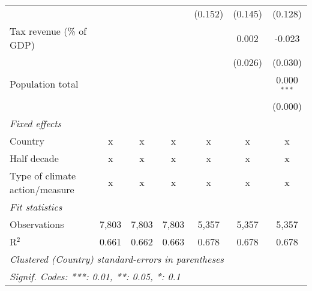\begin{tabular}{lcccccc}
                                                  &         &                &                & (0.152)        & (0.145)        & (0.128)\\   
   Tax revenue (\% of GDP)                        &         &                &                &                & 0.002          & -0.023\\   
                                                  &         &                &                &                & (0.026)        & (0.030)\\   
   Population total                               &         &                &                &                &                & 0.000$^{***}$\\   
                                                  &         &                &                &                &                & (0.000)\\   
   \emph{Fixed effects}\\
   Country                                        & x       & x              & x              & x              & x              & x\\  
   Half decade                                    & x       & x              & x              & x              & x              & x\\  
   Type of climate action/measure                 & x       & x              & x              & x              & x              & x\\  
   \midrule \emph{Fit statistics}\\
   Observations                                   & 7,803   & 7,803          & 7,803          & 5,357          & 5,357          & 5,357\\  
   R$^2$                                          & 0.661   & 0.662          & 0.663          & 0.678          & 0.678          & 0.678\\  
   \midrule
   \multicolumn{7}{l}{\emph{Clustered (Country) standard-errors in parentheses}}\\
   \multicolumn{7}{l}{\emph{Signif. Codes: ***: 0.01, **: 0.05, *: 0.1}}\\
\end{tabular}
\par\endgroup


